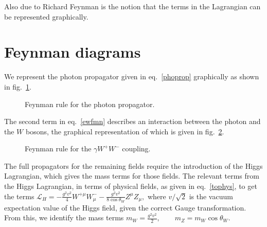 Also due to Richard Feynman is the notion that the terms in the Lagrangian can be represented graphically.

\section{Feynman diagrams}
We represent the photon propagator given in eq.~\eqref{phoprop} graphically as shown in fig.~\ref{phoprop}.

\begin{figure}[hbtp]
\begin{minipage}[c]{.69\textwidth}\centering\footnotesize
{}
\end{minipage}\hfill
\begin{minipage}[c]{.3\textwidth}
\caption{Feynman rule for the photon propagator.}
\label{phoprop}
\end{minipage}
\end{figure}

The second term in eq.~\eqref{ewfmn} describes an interaction between the photon and the $W$ bosons, the graphical representation of which is given in fig.~\ref{wwgam}.

\begin{figure}[htbp]
\begin{minipage}[b]{.69\textwidth}\centering\footnotesize
{}
\end{minipage}\hfill
\begin{minipage}[b]{.3\textwidth}
\caption{Feynman rule for the $\gamma W^{+}W^{-}$ coupling.}
\label{wwgam}
\end{minipage}
\end{figure}

The full propagators for the remaining fields require the introduction of the Higgs Lagrangian, which gives the mass terms for those fields. The relevant terms from the Higgs Lagrangian, in terms of physical fields, as given in eq.~\eqref{tophys}, to get the terms
\(\mathcal{L}_H=-\frac{g^2v^2}{4}W^{+\mu}W^{-}_\mu-\frac{g^2v^2}{8\cos\theta_W}Z^\mu Z_\mu,\)
where $v/\sqrt{2}$ is the vacuum expectation value of the Higgs field, given the correct Gauge transformation. From this, we identify the mass terms
\(m_W=\frac{g^2v^2}{2},\qquad m_Z=m_W\cos\theta_W.\)

